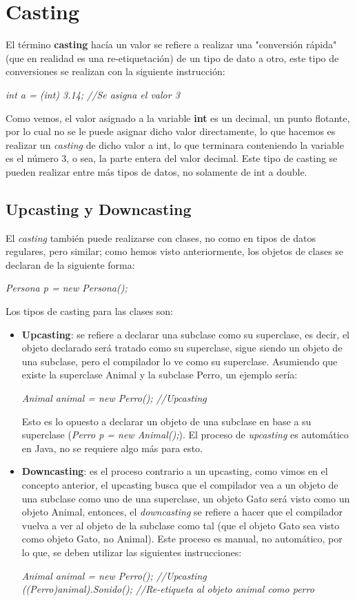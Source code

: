 \section{Casting}
El término \textbf{casting} hacía un valor se refiere a realizar una "conversión rápida" (que en realidad es una re-etiquetación) de un tipo de dato a otro, este tipo de conversiones se realizan con la siguiente instrucción:\begin{center}\textit{int a = (int) 3.14; //Se asigna el valor 3}\end{center}
Como vemos, el valor asignado a la variable \textbf{int} es un decimal, un punto flotante, por lo cual no se le puede asignar dicho valor directamente, lo que hacemos es realizar un \textit{casting} de dicho valor a int, lo que terminara conteniendo la variable es el número 3, o sea, la parte entera del valor decimal. Este tipo de casting se pueden realizar entre más tipos de datos, no solamente de int a double.

\subsection{Upcasting y Downcasting}
El \textit{casting} también puede realizarse con clases, no como en tipos de datos regulares, pero similar; como hemos visto anteriormente, los objetos de clases se declaran de la siguiente forma:\begin{center}\textit{Persona p = new Persona();}\end{center}
Los tipos de casting para las clases son:
\begin{itemize}
    \item \textbf{Upcasting}: se refiere a declarar una subclase como su superclase, es decir, el objeto declarado será tratado como su superclase, sigue siendo un objeto de una subclase, pero el compilador lo ve como su            superclase. Asumiendo que existe la superclase Animal y la subclase Perro, un ejemplo sería:\begin{center}\textit{Animal animal = new Perro(); //Upcasting}\end{center}
            Esto es lo opuesto a declarar un objeto de una subclase en base a su superclase (\textit{Perro p = new Animal();}). El proceso de \textit{upcasting} es automático en Java, no se requiere algo más para esto.
    \item \textbf{Downcasting}: es el proceso contrario a un upcasting, como vimos en el concepto anterior, el upcasting busca que el compilador vea a un objeto de una subclase como uno de una superclase, un objeto Gato será         visto como un objeto Animal, entonces, el \textit{downcasting} se refiere a hacer que el compilador vuelva a ver al objeto de la subclase como tal (que el objeto Gato sea visto como objeto Gato, no Animal). Este         proceso es manual, no automático, por lo que, se deben utilizar las siguientes instrucciones:\begin{center}\textit{Animal animal = new Perro(); //Upcasting\\((Perro)animal).Sonido(); //Re-etiqueta al                     objeto animal como perro}\end{center}
\end{itemize}



